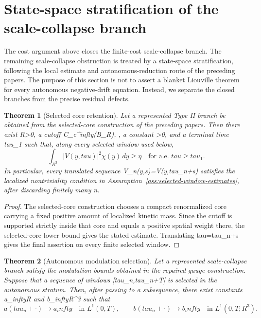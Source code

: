 \documentclass[11pt]{amsart}
\def\({}%
\def\){}%
\def\mathbb#1{#1}%
\def\tau{tau}%
\def\infty{infty}%
\theoremstyle{plain}
\newtheorem{theorem}{Theorem}[section]
\theoremstyle{definition}
\theoremstyle{remark}
\begin{document}
\section{State-space stratification of the scale-collapse branch}
\label{sec:branch-closure}

The cost argument above closes the finite-cost scale-collapse branch.  The remaining
scale-collapse obstruction is treated by a state-space stratification, following the local
estimate and autonomous-reduction route of the preceding papers.  The purpose of this section is
not to assert a blanket Liouville theorem for every autonomous negative-drift equation.  Instead,
we separate the closed branches from the precise residual defects.

\begin{theorem}[Selected core retention]\label{thm:core-retention}
Let a represented Type II branch be obtained from the selected-core construction of the preceding
papers.  Then there exist \(R>0\), a cutoff \(\chi\in C_c^\infty(B_R)\), \(\chi{}\), a
constant \(\eta>0\), and a terminal time \(\tau_1\) such that, along every selected window used
below,
\[
  \int_{\mathbb R^3}|V(y,\tau)|^2\chi(y)\,dy\ge\eta
  \quad\text{for a.e. }\tau\ge\tau_1.
\]
In particular, every translated sequence \(V_n(y,s)=V(y,\tau_n+s)\) satisfies the localized
nontriviality condition in Assumption~\ref{ass:selected-window-estimates}, after discarding
finitely many \(n\).
\end{theorem}

\begin{proof}
The selected-core construction chooses a compact renormalized core carrying a fixed positive
amount of localized kinetic mass.  Since the cutoff \(\chi\) is supported strictly inside that
core and equals a positive spatial weight there, the selected-core lower bound gives the stated
estimate.  Translating \(\tau=\tau_n+s\) gives the final assertion on every finite selected
window.
\end{proof}

\begin{theorem}[Autonomous modulation selection]\label{thm:autonomous-modulation-selection}
Let a represented scale-collapse branch satisfy the modulation bounds obtained in the repaired
gauge construction.  Suppose that a sequence of windows \([\tau_n,\tau_n+T]\) is selected in the
autonomous stratum.  Then, after passing to a subsequence, there exist constants
\(a_\infty\in\mathbb R\) and \(b_\infty\in\mathbb R^3\) such that
\[
  a(\tau_n+\cdot)\to a_\infty
  \quad\text{in }L^1(0,T),
  \qquad
  b(\tau_n+\cdot)\to b_\infty
  \quad\text{in }L^1(0,T;\mathbb R^3).
\]
\end{theorem}
\end{document}
